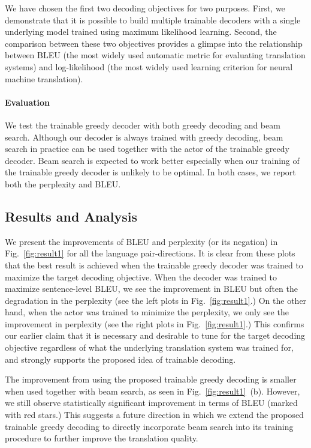 We have chosen the first two decoding objectives for two purposes. First, we demonstrate that it is possible to build multiple trainable decoders with a single underlying model trained using maximum likelihood learning. Second, the comparison between these two objectives provides a glimpse into the relationship between BLEU (the most widely used automatic metric for evaluating translation systems) and log-likelihood (the most widely used learning criterion for neural machine translation).%
\paragraph{Evaluation}
We test the trainable greedy decoder with both greedy decoding and beam search. Although our decoder is always trained with greedy decoding, beam search in practice can be used together with the actor of the trainable greedy decoder. Beam search is expected to work better especially when our training of the trainable greedy decoder is unlikely to be optimal. In both cases, we report both the perplexity and BLEU.


\subsection{Results and Analysis}

We present the improvements of BLEU and perplexity (or its negation) in Fig.~\ref{fig:result1} for all the language pair-directions. It is clear from these plots that the best result is achieved when the trainable greedy decoder was trained to maximize the target decoding objective. When the decoder was trained to maximize sentence-level BLEU, we see the improvement in BLEU but often the degradation in the perplexity (see the left plots in Fig.~\ref{fig:result1}.) On the other hand, when the actor was trained to minimize the perplexity, we only see the improvement in perplexity (see the right plots in Fig.~\ref{fig:result1}.) This confirms our earlier claim that it is necessary and desirable to tune for the target decoding objective regardless of what the underlying translation system was trained for, and strongly supports the proposed idea of trainable decoding.

The improvement from using the proposed trainable greedy decoding is smaller when used together with beam search, as seen in Fig.~\ref{fig:result1}~(b). However, we still observe statistically significant improvement in terms of BLEU (marked with red stars.) This suggests a future direction in which we extend the proposed trainable greedy decoding to directly incorporate beam search into its training procedure to further improve the translation quality. 

